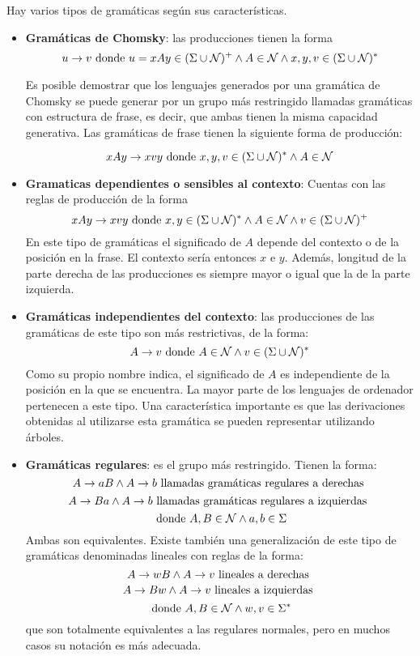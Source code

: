 Hay varios tipos de gramáticas según sus características.
\begin{itemize}
\item \textbf{Gramáticas de Chomsky}: las producciones tienen la forma \[u \rightarrow v \textup{ donde } u=xAy \in (\Sigma \cup \mathcal{N})^{+} \wedge A \in \mathcal{N} \wedge x, y, v \in (\Sigma \cup \mathcal{N})^{*}\]

Es posible demostrar que los lenguajes generados por una gramática de Chomsky se puede generar por un grupo más restringido llamadas gramáticas con estructura de frase, es decir, que ambas tienen la misma capacidad generativa. Las gramáticas de frase tienen la siguiente forma de producción:

\[xAy \rightarrow xvy \textup{ donde } x,y,v \in (\Sigma \cup \mathcal{N})^{*} \wedge A \in \mathcal{N}\]
\item \textbf{Gramaticas dependientes o sensibles al contexto}: Cuentas con las reglas de producción de la forma  \[xAy \rightarrow xvy \textup{ donde } x, y \in (\Sigma \cup \mathcal{N})^{*} \wedge A \in \mathcal{N} \wedge v \in (\Sigma \cup \mathcal{N})^{+}\]
En este tipo de gramáticas el significado de $A$ depende del contexto o de la posición en la frase. El contexto sería entonces $x$ e $y$. Además, longitud de la parte derecha de las producciones es siempre mayor o igual que la de la parte izquierda.
\item \textbf{Gramáticas independientes del contexto}: las producciones de las gramáticas de este tipo son más restrictivas, de la forma: 
\[A \rightarrow v \textup{ donde } A \in \mathcal{N} \wedge v \in (\Sigma \cup \mathcal{N})^{*}\]
Como su propio nombre indica, el significado de $A$ es independiente de la posición en la que se encuentra. La mayor parte de los lenguajes de ordenador pertenecen a este tipo. Una característica importante es que las derivaciones obtenidas al utilizarse esta gramática se pueden representar utilizando árboles.

\item \textbf{Gramáticas regulares}: es el grupo más restringido. Tienen la forma: \[A \rightarrow aB \wedge A \rightarrow b \textup{ llamadas gramáticas regulares a derechas } \]
\[A \rightarrow Ba \wedge A \rightarrow b \textup{ llamadas gramáticas regulares a izquierdas } \]
\[ \textup{ donde }A, B \in \mathcal{N} \wedge a,b \in \Sigma  \]
Ambas son equivalentes. Existe también una generalización de este tipo de gramáticas denominadas lineales con reglas de la forma: \[A \rightarrow wB \wedge A \rightarrow v \textup{ lineales a derechas } \]
\[A \rightarrow Bw \wedge A \rightarrow v \textup{ lineales a izquierdas } \]
\[ \textup{ donde }A, B \in \mathcal{N} \wedge w,v \in \Sigma^{*}  \]
que son totalmente equivalentes a las regulares normales, pero en muchos casos su notación es más adecuada.
\end{itemize}

